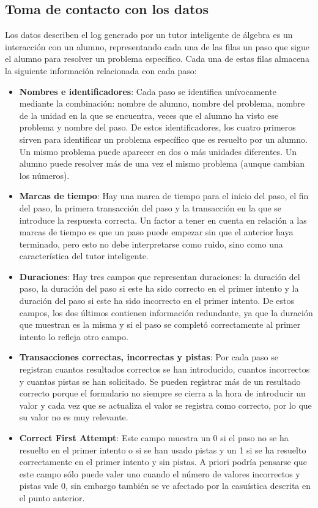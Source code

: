 \documentclass[acmtog, screen]{acmart}
\begin{document}
\subsection{Toma de contacto con los datos}
Los datos describen el log generado por un tutor inteligente de álgebra es un interacción con un alumno, representando cada una de las filas un paso que sigue el alumno para resolver un problema específico. Cada una de estas filas almacena la siguiente información relacionada con cada paso:
\begin{itemize}
	\item \textbf{Nombres e identificadores}: Cada paso se identifica unívocamente mediante la combinación: nombre de alumno, nombre del problema, nombre de la unidad en la que se encuentra, veces que el alumno ha visto ese problema y nombre del paso. De estos identificadores, los cuatro primeros sirven para identificar un problema específico que es resuelto por un alumno. Un mismo problema puede aparecer en dos o más unidades diferentes. Un alumno puede resolver más de una vez el mismo problema (aunque cambian los números).
	\item \textbf{Marcas de tiempo}: Hay una marca de tiempo para el inicio del paso, el fin del paso, la primera transacción del paso y la transacción en la que se introduce la respuesta correcta. Un factor a tener en cuenta en relación a las marcas de tiempo es que un paso puede empezar sin que el anterior haya terminado, pero esto no debe interpretarse como ruido, sino como una característica del tutor inteligente.
	\item \textbf{Duraciones}: Hay tres campos que representan duraciones: la duración del paso, la duración del paso si este ha sido correcto en el primer intento y la duración del paso si este ha sido incorrecto en el primer intento. De estos campos, los dos últimos contienen información redundante, ya que la duración que muestran es la misma y si el paso se completó correctamente al primer intento lo refleja otro campo.
	\item \textbf{Transacciones correctas, incorrectas y pistas}: Por cada paso se registran cuantos resultados correctos se han introducido, cuantos incorrectos y cuantas pistas se han solicitado. Se pueden registrar más de un resultado correcto porque el formulario no siempre se cierra a la hora de introducir un valor y cada vez que se actualiza el valor se registra como correcto, por lo que su valor no es muy relevante.
	\item \textbf{Correct First Attempt}: Este campo muestra un 0 si el paso no se ha resuelto en el primer intento o si se han usado pistas y un 1 si se ha resuelto correctamente en el primer intento y sin pistas. A priori podría pensarse que este campo sólo puede valer uno cuando el número de valores incorrectos y pistas vale 0, sin embargo también se ve afectado por la casuística descrita en el punto anterior.

\end{itemize}
\end{document}
